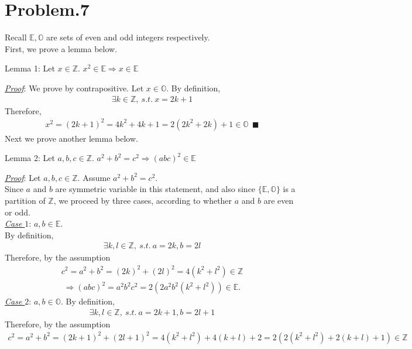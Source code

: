 \documentclass[12pt]{article}
\begin{document}
\section*{Problem.7}
Recall $\mathbb{E}, \mathbb{O}$ are sets of even and odd integers respectively.\\
First, we prove a lemma below.
\begin{center}
Lemma 1: Let $x \in \mathbb{Z}$. $x^2 \in \mathbb{E} \Rightarrow x \in \mathbb{E}$
\end{center}
\underline{\textit{Proof}}: We prove by contrapositive. Let $x \in \mathbb{O}$. By definition,
\begin{gather*}
\exists k \in \mathbb{Z},~s.t.~ x = 2k + 1
\end{gather*}
Therefore,
\begin{gather*}
x^2 =  (2k + 1)^2 = 4k^2 + 4k + 1 = 2(2k^2 + 2k) + 1 \in \mathbb{O} ~~\blacksquare
\end{gather*}
Next we prove another lemma below.
\begin{center}
Lemma 2: Let $a,b,c \in \mathbb{Z}$. $ a^2 + b^2 = c^2 \Rightarrow (abc)^2 \in \mathbb{E}$
\end{center}
\underline{\textit{Proof}}:
Let $a,b,c \in \mathbb{Z}$. Assume $a^2 + b^2 = c^2$.\\
Since $a$ and $b$ are symmetric variable in this statement, and also since $\{\mathbb{E}, \mathbb{O}\}$ is a partition of $\mathbb{Z}$, we proceed by three cases, according to whether $a$ and $b$ are even or odd.\\[1em]
\underline{\textit{Case $1$}}: $a, b \in \mathbb{E}$.\\
By definition,
\begin{gather*}
\exists k, l \in \mathbb{Z},~s.t.~ a = 2k, b = 2l
\end{gather*}
Therefore, by the assumption
\begin{gather*}
c^2 = a^2 + b^2 = (2k)^2 + (2l)^2 = 4(k^2+l^2) \in \mathbb{Z}
\end{gather*}
\begin{gather*}
\Rightarrow (abc)^2 = a^2 b^2 c^2 = 2 (2 a^2 b^2 (k^2+l^2)) \in \mathbb{E}.
\end{gather*}
\underline{\textit{Case $2$}}: $a, b \in \mathbb{O}$.
By definition,
\begin{gather*}
\exists k, l \in \mathbb{Z},~s.t.~ a = 2k+1, b = 2l+1
\end{gather*}
Therefore, by the assumption
\begin{gather*}
c^2 = a^2 + b^2 = (2k+1)^2 + (2l+1)^2 = 4(k^2+l^2) + 4(k+l) + 2 = 2(2(k^2+l^2) +2(k+l) + 1) \in \mathbb{Z}
\end{gather*}
\end{document}
